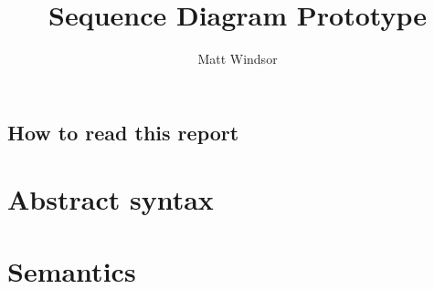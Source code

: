 \documentclass[a4paper]{memoir}
\title{\langname{} Sequence Diagram Prototype}
\author{Matt Windsor}
\theoremstyle{definition}
\begin{document}
\pagestyle{sruled}

\maketitle

\tableofcontents{}


\section*{How to read this report}


\chapter{Abstract syntax}


\chapter{Semantics}

\end{document}
